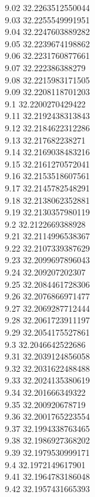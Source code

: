 {9.02	32.2263512550044\\
9.03	32.2255549991951\\
9.04	32.2247603889282\\
9.05	32.2239674198862\\
9.06	32.2231760877661\\
9.07	32.222386388279\\
9.08	32.2215983171505\\
9.09	32.2208118701203\\
9.1	32.2200270429422\\
9.11	32.2192438313843\\
9.12	32.2184622312286\\
9.13	32.217682238271\\
9.14	32.2169038483216\\
9.15	32.2161270572041\\
9.16	32.2153518607561\\
9.17	32.2145782548291\\
9.18	32.2138062352881\\
9.19	32.2130357980119\\
9.2	32.2122669388928\\
9.21	32.2114996538367\\
9.22	32.2107339387629\\
9.23	32.2099697896043\\
9.24	32.209207202307\\
9.25	32.2084461728306\\
9.26	32.2076866971477\\
9.27	32.2069287712444\\
9.28	32.2061723911197\\
9.29	32.2054175527861\\
9.3	32.2046642522686\\
9.31	32.2039124856058\\
9.32	32.2031622488488\\
9.33	32.2024135380619\\
9.34	32.201666349322\\
9.35	32.200920678719\\
9.36	32.2001765223554\\
9.37	32.1994338763465\\
9.38	32.1986927368202\\
9.39	32.1979530999171\\
9.4	32.1972149617901\\
9.41	32.1964783186048\\
9.42	32.1957431665393\\
}
